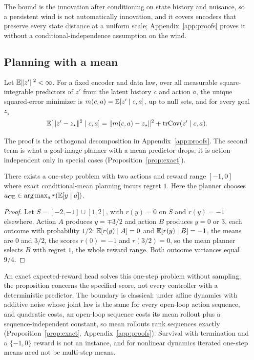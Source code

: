 The bound is the innovation after conditioning on state history and nuisance, so a persistent wind is
not automatically innovation, and it covers encoders that preserve every state distance at a uniform
scale; Appendix~\ref{app:proofs} proves it without a conditional-independence assumption on the wind.

\subsection{Planning with a mean}
\label{sec:theory-plan}

\begin{lemma}
\label{lem:mean}
Let $\mathbb{E}\|z'\|^2<\infty$.
For a fixed encoder and data law, over all measurable square-integrable predictors of $z'$ from the latent history $c$ and action $a$, the unique squared-error minimizer is $m(c,a)=\mathbb{E}[z'\mid c,a]$, up to null sets, and for every goal $z_\star$
\begin{equation}
\label{eq:decomposition}
\mathbb{E}[\|z'-z_\star\|^2\mid c,a]
=\|m(c,a)-z_\star\|^2+\mathrm{tr}\mathrm{Cov}(z'\mid c,a).
\end{equation}
\end{lemma}

The proof is the orthogonal decomposition in Appendix~\ref{app:proofs}. The second term is what a
goal-image planner with a mean predictor drops; it is action-independent only in special cases
(Proposition~\ref{prop:exact}).

\begin{proposition}
\label{prop:regret}
There exists a one-step problem with two actions and reward range $[-1,0]$ where exact conditional-mean planning incurs regret $1$.
Here the planner chooses $a_{\mathrm{CE}}\in\arg\max_a r(\mathbb{E}[y\mid a])$.
\end{proposition}
\begin{proof}
Let $S=[-2,-1]\cup[1,2]$, with $r(y)=0$ on $S$ and $r(y)=-1$ elsewhere. Action $A$ produces
$y=\mp3/2$ and action $B$ produces $y=0$ or $3$, each outcome with probability $1/2$: $\mathbb{E}[r(y)\mid A]=0$ and
$\mathbb{E}[r(y)\mid B]=-1$, the means are $0$ and $3/2$, the scores $r(0)=-1$ and $r(3/2)=0$, so the mean
planner selects $B$ with regret $1$, the whole reward range. Both outcome variances equal $9/4$.
\end{proof}

An exact expected-reward head solves this one-step problem without sampling; the proposition concerns the specified score, not every controller with a deterministic predictor. The boundary is classical: under affine dynamics with additive noise whose joint law is the same for every open-loop action sequence, and quadratic costs, an open-loop sequence costs its mean rollout plus a sequence-independent constant, so mean rollouts rank sequences exactly \citep{simon1956dynamic,theil1957note} (Proposition~\ref{prop:exact}, Appendix~\ref{app:proofs}). Survival with termination and a $\{-1,0\}$
reward is not an instance, and for nonlinear dynamics iterated one-step means need not be multi-step means.

